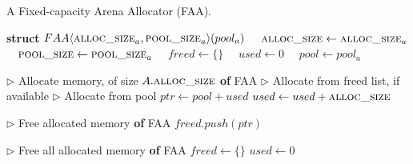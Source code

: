 \begin{algorithm}[H] %
\caption{A Fixed-capacity Arena Allocator (FAA).}
\label{alg:faa}
\begin{algorithmic}[1]

\Statex

\State \textbf{struct} $FAA \langle \textsc{alloc\_size}_a, \textsc{pool\_size}_a \rangle (pool_a)$
\State \ \ $\textsc{alloc\_size} \gets \textsc{alloc\_size}_a$  \label{alg:faa--init-const-begin}
\State \ \ $\textsc{pool\_size} \gets \textsc{pool\_size}_a$  \label{alg:faa--init-const-end}
\State \ \ $freed \gets \{\}$  \label{alg:faa--init-begin}
\State \ \ $used \gets 0$ 
\State \ \ $pool \gets pool_a$  \label{alg:faa--init-end}

\Statex

\State $\rhd$ Allocate memory, of size $A.\textsc{alloc\_size}$
 \textbf{of} FAA
  \State $\rhd$ Allocate from freed list, if available
    \label{alg:faa--allocate-freed}
  \EndIf
  \State $\rhd$ Allocate from pool
   \label{alg:faa--allocate-pool-begin}
    \State $ptr \gets pool + used$
    \State $used \gets used + \textsc{alloc\_size}$
  \EndIf \label{alg:faa--allocate-pool-end}
  \Return{$\phi$} \label{alg:faa--allocate-phi}
\EndFunction

\Statex

\State $\rhd$ Free allocated memory
 \textbf{of} FAA
  \State $freed.push(ptr)$ \label{alg:faa--deallocate-push}
\EndFunction

\Statex

\State $\rhd$ Free all allocated memory
 \textbf{of} FAA
  \State $freed \gets \{\}$ \label{alg:faa--reset-begin}
  \State $used \gets 0$ \label{alg:faa--reset-end}
\EndFunction
\end{algorithmic}
\end{algorithm}
